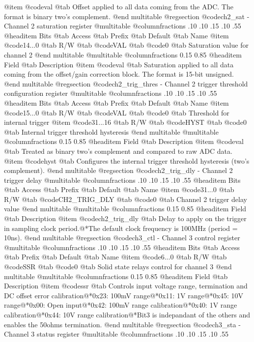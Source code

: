 @item @code{val} @tab Offset applied to all data coming from the ADC. The format is binary two's complement.
@end multitable
@regsection @code{ch2_sat} - Channel 2 saturation register
@multitable @columnfractions .10 .10 .15 .10 .55
@headitem Bits @tab Access @tab Prefix @tab Default @tab Name
@item @code{14...0}
@tab R/W @tab
@code{VAL}
@tab @code{0} @tab 
Saturation value for channel 2
@end multitable
@multitable @columnfractions 0.15 0.85
@headitem Field @tab Description
@item @code{val} @tab Saturation applied to all data coming from the offset/gain correction block. The format is 15-bit unsigned.
@end multitable
@regsection @code{ch2_trig_thres} - Channel 2 trigger threshold configuration register
@multitable @columnfractions .10 .10 .15 .10 .55
@headitem Bits @tab Access @tab Prefix @tab Default @tab Name
@item @code{15...0}
@tab R/W @tab
@code{VAL}
@tab @code{0} @tab 
Threshold for internal trigger
@item @code{31...16}
@tab R/W @tab
@code{HYST}
@tab @code{0} @tab 
Internal trigger threshold hysteresis
@end multitable
@multitable @columnfractions 0.15 0.85
@headitem Field @tab Description
@item @code{val} @tab Treated as binary two's complement and compared to raw ADC data.
@item @code{hyst} @tab Configures the internal trigger threshold hysteresis (two's complement).
@end multitable
@regsection @code{ch2_trig_dly} - Channel 2 trigger delay
@multitable @columnfractions .10 .10 .15 .10 .55
@headitem Bits @tab Access @tab Prefix @tab Default @tab Name
@item @code{31...0}
@tab R/W @tab
@code{CH2_TRIG_DLY}
@tab @code{0} @tab 
Channel 2 trigger delay value
@end multitable
@multitable @columnfractions 0.15 0.85
@headitem Field @tab Description
@item @code{ch2_trig_dly} @tab Delay to apply on the trigger in sampling clock period.@*The default clock frequency is 100MHz (period = 10ns).
@end multitable
@regsection @code{ch3_ctl} - Channel 3 control register
@multitable @columnfractions .10 .10 .15 .10 .55
@headitem Bits @tab Access @tab Prefix @tab Default @tab Name
@item @code{6...0}
@tab R/W @tab
@code{SSR}
@tab @code{0} @tab 
Solid state relays control for channel 3
@end multitable
@multitable @columnfractions 0.15 0.85
@headitem Field @tab Description
@item @code{ssr} @tab Controls input voltage range, termination and DC offset error calibration@*0x23: 100mV range@*0x11: 1V range@*0x45: 10V range@*0x00: Open input@*0x42: 100mV range calibration@*0x40: 1V range calibration@*0x44: 10V range calibration@*Bit3 is indepandant of the others and enables the 50ohms termination.
@end multitable
@regsection @code{ch3_sta} - Channel 3 status register
@multitable @columnfractions .10 .10 .15 .10 .55
